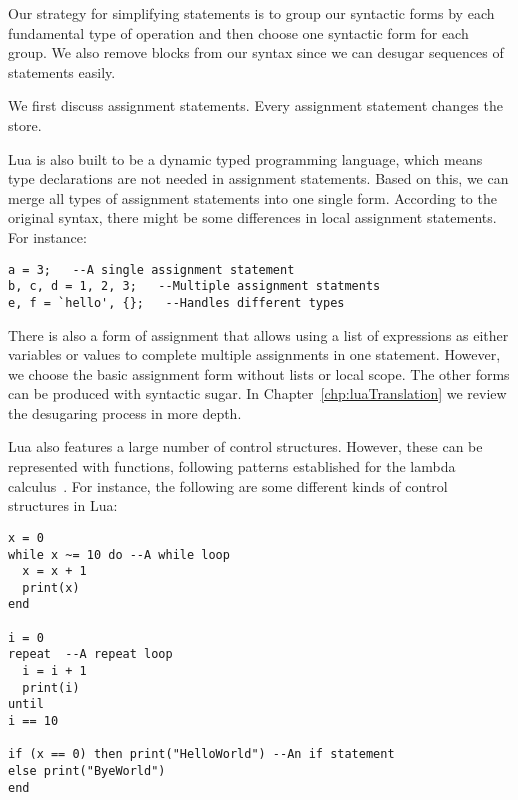 Our strategy for simplifying statements is to group our syntactic forms by each fundamental type of operation and then choose one syntactic form for each group.
We also remove blocks from our syntax since we can desugar sequences of statements easily.

We first discuss assignment statements.
Every assignment statement changes the store. 

Lua is also built to be a dynamic typed programming language, 
which means type declarations are not needed in assignment statements.
Based on this, we can merge all types of assignment statements into one single form. According to the original syntax, there might be some differences in local assignment statements.
For instance:

\begin{verbatim}
a = 3;   --A single assignment statement
b, c, d = 1, 2, 3;   --Multiple assignment statments
e, f = `hello', {};   --Handles different types
\end{verbatim}


There is also a form of assignment that allows using a list of expressions as either variables or values to complete multiple assignments in one statement. However, we choose the basic assignment form without lists or local scope.  The other forms can be produced with syntactic sugar.
In Chapter~\ref{chp:luaTranslation} we review the desugaring process in more depth.

Lua also features a large number of control structures.
However, these can be represented with functions,
following patterns established for the lambda calculus~\cite{TAPL}.
For instance, the following are some different kinds of control structures in Lua:
\begin{verbatim}
x = 0
while x ~= 10 do --A while loop
  x = x + 1
  print(x)
end

i = 0
repeat  --A repeat loop
  i = i + 1
  print(i)
until
i == 10

if (x == 0) then print("HelloWorld") --An if statement
else print("ByeWorld")
end
\end{verbatim}

